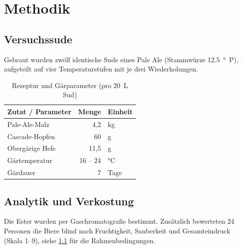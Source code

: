 \chapter{Methodik}
\label{ch:methodik}

\section{Versuchssude}
Gebraut wurden zwölf identische Sude eines Pale Ale (Stammwürze \SI{12.5}{\degree P}),
aufgeteilt auf vier Temperaturstufen mit je drei Wiederholungen.

\begin{table}[htbp]
  \centering
  \caption{Rezeptur und Gärparameter (pro \SI{20}{\liter} Sud)}
  \label{tab:rezept}
  \begin{tabular}{lrl}
    \toprule
    Zutat / Parameter & Menge   & Einheit \\
    \midrule
    Pale-Ale-Malz     & 4{,}2   & kg \\
    Cascade-Hopfen    & 60      & g \\
    Obergärige Hefe   & 11{,}5  & g \\
    Gärtemperatur     & 16 -- 24 & \si{\celsius} \\
    Gärdauer          & 7       & Tage \\
    \bottomrule
  \end{tabular}
\end{table}

\section{Analytik und Verkostung}
Die Ester wurden per Gaschromatografie bestimmt. Zusätzlich bewerteten 24 Personen
die Biere blind nach Fruchtigkeit, Sauberkeit und Gesamteindruck
(Skala 1--9), siehe \cref{tab:rezept} für die Rahmenbedingungen.

